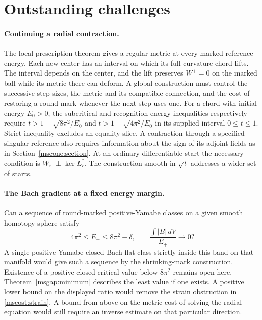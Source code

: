 \documentclass[11pt]{article}
\numberwithin{equation}{section}
\theoremstyle{definition}
\theoremstyle{remark}
\begin{document}
\section{Outstanding challenges}\label{sec:outlook}

\paragraph{Continuing a radial contraction.}
The local prescription theorem gives a regular metric at every marked
reference energy. Each new center has an interval on which its full
curvature chord lifts. The interval depends on the center, and the
lift preserves \(W^+=0\) on the marked ball while its metric there can
deform. A global construction must control the successive step sizes,
the metric and its compatible connection, and the cost of restoring
a round mark whenever the next step uses one. For a chord with initial energy \(E_0>0\), the subcritical and
recognition energy inequalities respectively require
\(t>1-\sqrt{8\pi^2/E_0}\) and \(t>1-\sqrt{4\pi^2/E_0}\) in its supplied
interval \(0\le t\le1\). Strict inequality excludes an equality slice.
A contraction through a specified singular reference also requires information about the sign
of its adjoint fields as in Section~\ref{mscone:section}. At an ordinary
differentiable start the necessary condition is \(W_r^+\perp\ker L_r^*\).
The construction smooth in \(\sqrt t\) addresses a wider set of starts.

\paragraph{The Bach gradient at a fixed energy margin.}
Can a sequence of round-marked positive-Yamabe classes on a given smooth
homotopy sphere satisfy
\[
 4\pi^2\le E_+\le8\pi^2-\delta,\qquad
 \frac{\int |B|\,dV}{E_+}\longrightarrow0?
\]
A single positive-Yamabe closed Bach-flat class strictly inside this
band on that manifold would give such a sequence by the shrinking-mark
construction. Existence of a positive closed critical value below
\(8\pi^2\) remains open here. Theorem~\ref{msgap:minimum}
describes the least value if one exists. A positive lower bound on
the displayed ratio would remove the strain obstruction in
\eqref{mscost:strain}. A bound from above on the metric cost of
solving the radial equation would still require an inverse estimate
on that particular direction.
\end{document}
